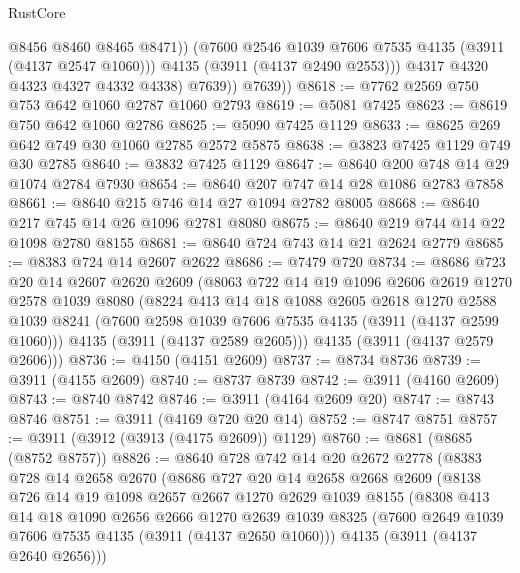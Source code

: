 \begin{lexlean}{RustCore}
\begin{coremodule}
                    @8456
                    @8460
                    @8465
                    @8471))
                (@7600 @2546 @1039 @7606 @7535 @4135 (@3911 (@4137 @2547 @1060)))
                @4135
                (@3911 (@4137 @2490 @2553)))
              @4317
              @4320
              @4323
              @4327
              @4332
              @4338)
            @7639))
        @7639))
@8618 := @7762 @2569 @750 @753 @642 @1060 @2787 @1060 @2793
@8619 := @5081 @7425
@8623 := @8619 @750 @642 @1060 @2786
@8625 := @5090 @7425 @1129
@8633 := @8625 @269 @642 @749 @30 @1060 @2785 @2572 @5875
@8638 := @3823 @7425 @1129 @749 @30 @2785
@8640 := @3832 @7425 @1129
@8647 := @8640 @200 @748 @14 @29 @1074 @2784 @7930
@8654 := @8640 @207 @747 @14 @28 @1086 @2783 @7858
@8661 := @8640 @215 @746 @14 @27 @1094 @2782 @8005
@8668 := @8640 @217 @745 @14 @26 @1096 @2781 @8080
@8675 := @8640 @219 @744 @14 @22 @1098 @2780 @8155
@8681 := @8640 @724 @743 @14 @21 @2624 @2779
@8685 := @8383 @724 @14 @2607 @2622
@8686 := @7479 @720
@8734 := @8686
    @723
    @20
    @14
    @2607
    @2620
    @2609
    (@8063
      @722
      @14
      @19
      @1096
      @2606
      @2619
      @1270
      @2578
      @1039
      @8080
      (@8224
        @413
        @14
        @18
        @1088
        @2605
        @2618
        @1270
        @2588
        @1039
        @8241
        (@7600 @2598 @1039 @7606 @7535 @4135 (@3911 (@4137 @2599 @1060)))
        @4135
        (@3911 (@4137 @2589 @2605)))
      @4135
      (@3911 (@4137 @2579 @2606)))
@8736 := @4150 (@4151 @2609)
@8737 := @8734 @8736
@8739 := @3911 (@4155 @2609)
@8740 := @8737 @8739
@8742 := @3911 (@4160 @2609)
@8743 := @8740 @8742
@8746 := @3911 (@4164 @2609 @20)
@8747 := @8743 @8746
@8751 := @3911 (@4169 @720 @20 @14)
@8752 := @8747 @8751
@8757 := @3911 (@3912 (@3913 (@4175 @2609)) @1129)
@8760 := @8681 (@8685 (@8752 @8757))
@8826 := @8640
    @728
    @742
    @14
    @20
    @2672
    @2778
    (@8383
      @728
      @14
      @2658
      @2670
      (@8686
        @727
        @20
        @14
        @2658
        @2668
        @2609
        (@8138
          @726
          @14
          @19
          @1098
          @2657
          @2667
          @1270
          @2629
          @1039
          @8155
          (@8308
            @413
            @14
            @18
            @1090
            @2656
            @2666
            @1270
            @2639
            @1039
            @8325
            (@7600 @2649 @1039 @7606 @7535 @4135 (@3911 (@4137 @2650 @1060)))
            @4135
            (@3911 (@4137 @2640 @2656)))

\end{coremodule}
\end{lexlean}
